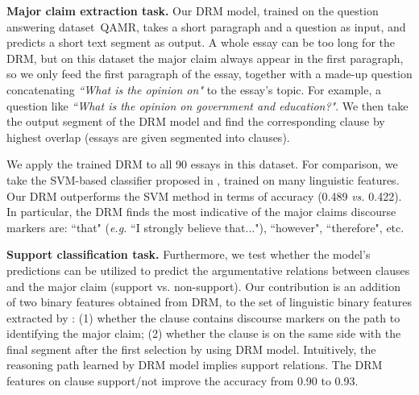 

\textbf{Major claim extraction task.} Our DRM model, trained on the question answering dataset~\textsc{QAMR}, takes a short paragraph and a question as input, and predicts a short text segment as output. A whole essay can be too long for the DRM, but on this dataset the major claim always appear in the first paragraph, so we only feed the first paragraph of the essay, together with a made-up question concatenating \textit{``What is the opinion on"} to the essay's topic. For example, a question like \textit{``What is the opinion on government and education?"}. We then take the output segment of the DRM model and find the corresponding clause by highest overlap (essays are given segmented into clauses). 

We apply the trained DRM to all 90 essays in this dataset. For comparison, we take the SVM-based classifier proposed in \cite{DBLP:conf/emnlp/StabG14}, trained on many linguistic features. Our DRM outperforms the SVM method in terms of accuracy (0.489 \emph{vs.} 0.422). In particular, the DRM finds the most indicative of the major claims discourse markers are: ``that" (\emph{e.g.} ``I strongly believe that..."), ``however", ``therefore", etc.




\textbf{Support classification task.} Furthermore, we test whether the model's predictions can be utilized to predict the argumentative relations between clauses and the major claim (support vs. non-support). Our contribution is an addition of two binary features obtained from DRM, to the set of linguistic binary features extracted by \cite{DBLP:conf/emnlp/StabG14}: (1) whether the clause contains discourse markers on the path to identifying the major claim; (2) whether the clause is on the same side with the final segment after the first selection by using DRM model. Intuitively, the reasoning path learned by DRM model implies support relations. The DRM features on clause support/not improve the accuracy from 0.90 to 0.93.



